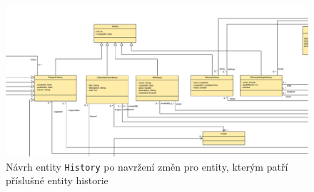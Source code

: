     \begin{figure}\centering
        \includegraphics[angle=90, height=0.9\textheight]{pdfs/History1_2}
        \caption[Návrh entity \texttt{History} po změnách návrhu]{Návrh entity \texttt{History} po navržení změn pro entity, kterým patří příslušné entity historie}\label{image:History1_2}
    \end{figure}

